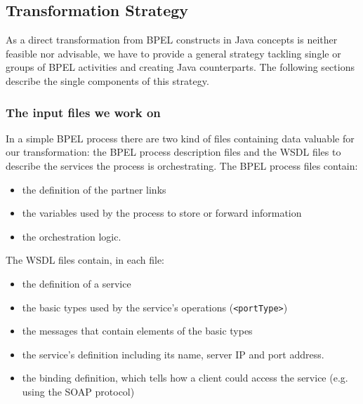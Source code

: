 \subsection{Transformation Strategy}
\label{sec:TransformationStrategy}
As a direct transformation from BPEL constructs in Java concepts is neither feasible nor advisable, we have to provide a general strategy tackling single or groups of BPEL activities and creating Java counterparts. The following sections describe the single components of this strategy.

\subsubsection{The input files we work on}
\label{sec:inputFiles}
In a simple BPEL process there are two kind of files containing data valuable for our transformation: the BPEL process description files and the WSDL files to describe the services the process is orchestrating.
The BPEL process files contain: 
\begin{itemize}
 \item the definition of the partner links
 \item the variables used by the process to store or forward information
 \item the orchestration logic.
\end{itemize}
The WSDL files contain, in each file: 
\begin{itemize}
 \item the definition of a service
 \item the basic types used by the service's operations (\verb|<portType>|)
 \item the messages that contain elements of the basic types
 \item the service's definition including its name, server IP and port address. 
 \item the binding definition, which tells how a client could access the service (e.g. using the SOAP protocol)
\end{itemize}

